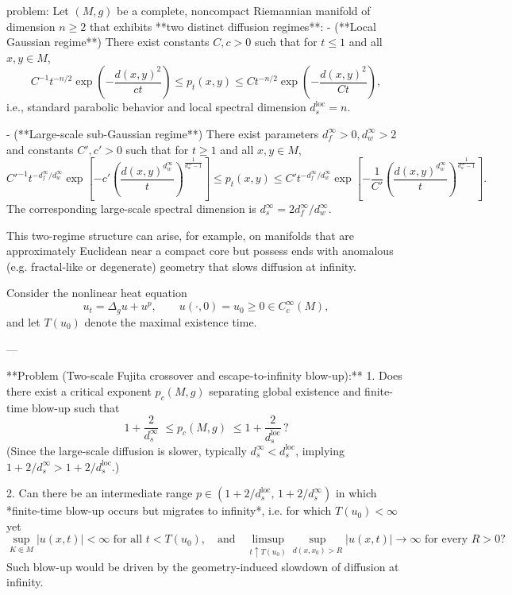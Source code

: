 problem:  
Let \((M,g)\) be a complete, noncompact Riemannian manifold of dimension \(n\ge2\) that exhibits **two distinct diffusion regimes**:  
- (**Local Gaussian regime**) There exist constants \(C,c>0\) such that for \(t\le1\) and all \(x,y\in M\),
  \[
  C^{-1}t^{-n/2}\exp\!\left(-\frac{d(x,y)^2}{ct}\right)
  \le p_t(x,y)
  \le Ct^{-n/2}\exp\!\left(-\frac{d(x,y)^2}{C t}\right),
  \]
  i.e., standard parabolic behavior and local spectral dimension \(d_s^{\text{loc}}=n\).  

- (**Large-scale sub-Gaussian regime**) There exist parameters \(d_f^\infty>0, d_w^\infty>2\) and constants \(C',c'>0\) such that for \(t\ge1\) and all \(x,y\in M\),
  \[
  C'^{-1}t^{-d_f^\infty/d_w^\infty}
  \exp\!\left[-c'\!\left(\frac{d(x,y)^{d_w^\infty}}{t}\right)^{\!\frac{1}{d_w^\infty-1}}\right]
  \le p_t(x,y)
  \le C't^{-d_f^\infty/d_w^\infty}
  \exp\!\left[-\frac1{C'}\!\left(\frac{d(x,y)^{d_w^\infty}}{t}\right)^{\!\frac{1}{d_w^\infty-1}}\right].
  \]
  The corresponding large-scale spectral dimension is \(d_s^{\infty} = 2d_f^\infty / d_w^\infty\).

This two-regime structure can arise, for example, on manifolds that are approximately Euclidean near a compact core but possess ends with anomalous (e.g. fractal-like or degenerate) geometry that slows diffusion at infinity.

Consider the nonlinear heat equation
\[
u_t = \Delta_g u + u^p, \qquad u(\cdot,0) = u_0 \ge 0\in C_c^\infty(M),
\]
and let \(T(u_0)\) denote the maximal existence time.

---

**Problem (Two-scale Fujita crossover and escape-to-infinity blow-up):**  
1. Does there exist a critical exponent \(p_c(M,g)\) separating global existence and finite-time blow-up such that  
   \[
   1+\frac{2}{d_s^{\infty}} \;\le p_c(M,g)\;\le 1+\frac{2}{d_s^{\text{loc}}}\,?
   \]
   (Since the large-scale diffusion is slower, typically \(d_s^{\infty}<d_s^{\text{loc}}\), implying \(1+2/d_s^{\infty}>1+2/d_s^{\text{loc}}\).)

2. Can there be an intermediate range \(p\in(1+2/d_s^{\text{loc}},\,1+2/d_s^{\infty})\) in which *finite-time blow-up occurs but migrates to infinity*, i.e. for which \(T(u_0)<\infty\) yet
   \[
   \sup_{K\Subset M} |u(x,t)|<\infty \text{ for all } t<T(u_0),
   \quad
   \text{and}\quad \limsup_{t\uparrow T(u_0)}\sup_{d(x,x_0)>\!R}|u(x,t)|\to\infty
   \text{ for every } R>0?
   \]
   Such blow-up would be driven by the geometry-induced slowdown of diffusion at infinity.

